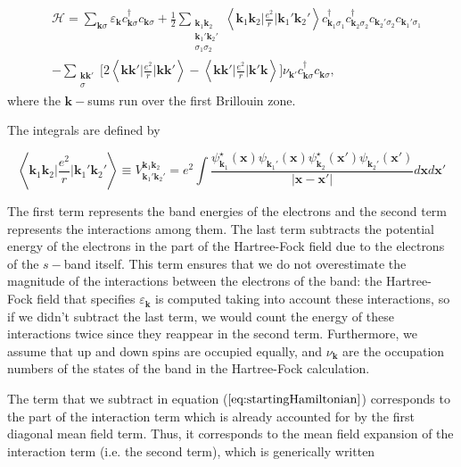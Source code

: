 \begin{equation}\label{eq:startingHamiltonian}
\begin{split}
&\mathcal{H} = \sum_{\bm k \sigma} \varepsilon_{\bm k} c_{\bm k \sigma}^\dagger c_{\bm k \sigma} + \frac{1}{2} \sum_{ \substack{\bm k_1 \bm k_2 \\ \bm k_1' \bm k_2' \\ \sigma_1 \sigma_2 } } \left\langle \bm k_1 \bm k_2 \bigg| \frac{e^2}{r} \bigg| \bm k_1' \bm k_2' \right\rangle 
 c_{\bm k_1 \sigma_1}^\dagger c_{\bm k_2 \sigma_2}^\dagger c_{\bm k_2' \sigma_2} c_{\bm k_1' \sigma_1} \\
 &- \sum_{ \substack{\bm k \bm k' \\ \sigma} } \bigg[ 2 \left\langle \bm k \bm k' \bigg| \frac{e^2}{r} \bigg| \bm k \bm k' \right\rangle - \left\langle \bm k \bm k' \bigg| \frac{e^2}{r} \bigg| \bm k' \bm k \right\rangle \bigg] \nu_{\bm k'} c_{\bm k \sigma}^\dagger c_{\bm k \sigma} ,
\end{split}
\end{equation}
where the $\bm k-$sums run over the first Brillouin zone.

The integrals are defined by

\begin{equation}\label{eq:integrals}
\left\langle \bm k_1 \bm k_2 \bigg| \frac{e^2}{r} \bigg| \bm k_1' \bm k_2' \right\rangle \equiv V^{\bm k_1 \bm k_2}_{\bm k_1' \bm k_2'}  =  e^2 \int \frac{\psi_{\bm k_1}^\star (\bm x) \psi_{\bm k_1'} (\bm x) \psi_{\bm k_2}^\star (\bm x') \psi_{\bm k_2'}(\bm x') }{| \bm x - \bm x' |} d\bm x d\bm x'
\end{equation}

The first term represents the band energies of the electrons and the second term represents the interactions among them. The last term subtracts the potential energy of the electrons in the part of the Hartree-Fock field due to the electrons of the $s-$band itself. This term ensures that we do not overestimate the magnitude of the interactions between the electrons of the band: the Hartree-Fock field that specifies $\varepsilon_{\bm k}$ is computed taking into account these interactions, so if we didn't subtract the last term, we would count the energy of these interactions twice since they reappear in the second term. Furthermore, we assume that up and down spins are occupied equally, and $\nu_{\bm k}$ are the occupation numbers of the states of the band in the Hartree-Fock calculation. 

The term that we subtract in equation ($\ref{eq:startingHamiltonian}$) corresponds to the part of the interaction term which is already accounted for by the first diagonal mean field term. Thus, it corresponds to the mean field expansion of the interaction term (i.e. the second term), which is generically written

